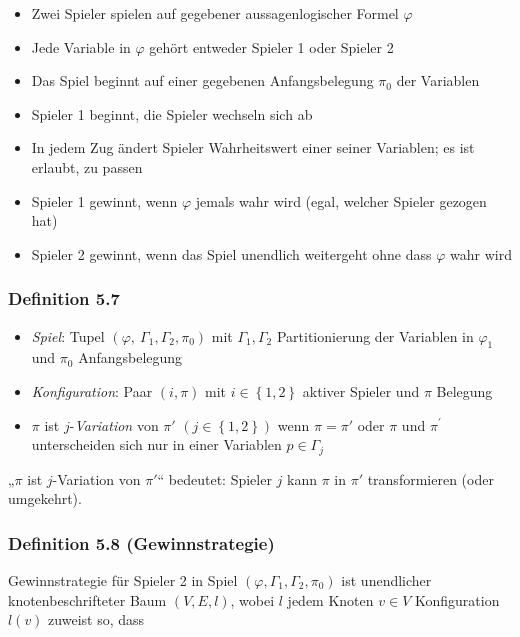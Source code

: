 \begin{itemize}
\item
  Zwei Spieler spielen auf gegebener aussagenlogischer Formel
  $\varphi$
\item
  Jede Variable in $\varphi$ gehört entweder Spieler 1 oder Spieler 2
\item
  Das Spiel beginnt auf einer gegebenen Anfangsbelegung $\pi_{0}$ der
  Variablen
\item
  Spieler 1 beginnt, die Spieler wechseln sich ab
\item
  In jedem Zug ändert Spieler Wahrheitswert einer seiner Variablen; es
  ist erlaubt, zu passen
\item
  Spieler 1 gewinnt, wenn $\varphi$ jemals wahr wird (egal, welcher
  Spieler gezogen hat)
\item
  Spieler 2 gewinnt, wenn das Spiel unendlich weitergeht ohne dass
  $\varphi$ wahr wird
\end{itemize}

\subsubsection{Definition 5.7}\label{definition-5.7}

\begin{itemize}
\item
  \emph{Spiel}: Tupel
  $\left( \varphi,\ \Gamma_{1},\Gamma_{2},\pi_{0} \right)$ mit
  $\Gamma_{1},\Gamma_{2}$ Partitionierung der Variablen in
  $\varphi_{1}$ und $\pi_{0}$ Anfangsbelegung
\item
  \emph{Konfiguration}: Paar $(i,\pi)$ mit
  $i \in \left\{ 1,2 \right\}$ aktiver Spieler und $\pi$ Belegung
\item
  $\pi$ ist $j$-\emph{Variation} von $\pi'$
  $\left( j \in \left\{ 1,2 \right\} \right)$ wenn $\pi = \pi'$ oder
  $\pi$ und $\pi^{'}$ unterscheiden sich nur in einer Variablen
  $p \in \Gamma_{j}$
\end{itemize}

„$\pi$ ist $j$-Variation von $\pi'$`` bedeutet: Spieler $j$ kann
$\pi$ in $\pi'$ transformieren (oder umgekehrt).

\subsubsection{Definition 5.8
(Gewinnstrategie)}\label{definition-5.8-gewinnstrategie}

Gewinnstrategie für Spieler 2 in Spiel
$\left( \varphi,\Gamma_{1},\Gamma_{2},\pi_{0} \right)$ ist unendlicher
knotenbeschrifteter Baum $(V,E,l)$, wobei $l$ jedem Knoten
$v \in V$ Konfiguration $l(v)$ zuweist so, dass

